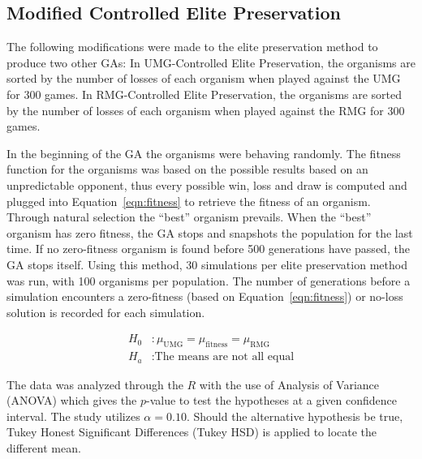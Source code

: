 \documentclass{strrespaper-journ}
\begin{document}
		\subsection{Modified Controlled Elite Preservation}
			The following modifications were made to the elite preservation method to produce two other GAs:
			In UMG-Controlled Elite Preservation, the organisms are sorted by the number of losses of each organism when played against the UMG for 300 games.
			In RMG-Controlled Elite Preservation, the organisms are sorted by the number of losses of each organism when played against the RMG for 300 games.

			In the beginning of the GA the organisms were behaving randomly.
			The fitness function for the organisms was based on the possible results based on an unpredictable opponent, thus every possible win, loss and draw is computed and plugged into Equation~\ref{eqn:fitness} to retrieve the fitness of an organism.
			Through natural selection the \enquote{best} organism prevails.
			When the \enquote{best} organism has zero fitness, the GA stops and snapshots the population for the last time.
			If no zero-fitness organism is found before 500 generations have passed, the GA stops itself.
			Using this method, 30 simulations per elite preservation method was run, with 100 organisms per population.
			The number of generations before a simulation encounters a zero-fitness (based on Equation~\ref{eqn:fitness}) or no-loss solution is recorded for each simulation.

			\begin{align*}
				H_0 & : \mu_\mathrm{UMG} = \mu_\mathrm{fitness} = \mu_\mathrm{RMG} \\
				H_a & : \text{The means are not all equal}
			\end{align*}

			The data was analyzed through the $R$ with the use of Analysis of Variance (ANOVA) which gives the $p$-value to test the hypotheses at a given confidence interval.
			The study utilizes $\alpha = 0.10$.
			Should the alternative hypothesis be true, Tukey Honest Significant Differences (Tukey HSD) is applied to locate the different mean.
\end{document}
